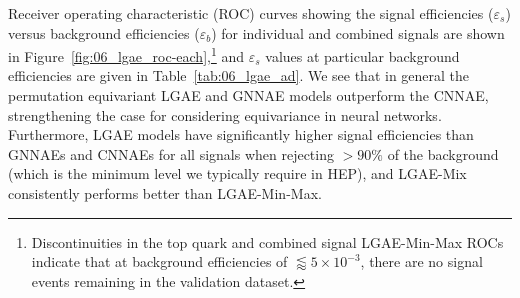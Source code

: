 Receiver operating characteristic (ROC) curves showing the signal efficiencies ($\varepsilon_s$) versus background efficiencies ($\varepsilon_b$) for individual and combined signals are shown in Figure~\ref{fig:06_lgae_roc-each},\footnote{Discontinuities in the top quark and combined signal LGAE-Min-Max ROCs indicate that at background efficiencies of $\lessapprox 5\times10^{-3}$, there are no signal events remaining in the validation dataset.} and $\varepsilon_s$ values at particular background efficiencies are given in Table~\ref{tab:06_lgae_ad}.
We see that in general the permutation equivariant LGAE and GNNAE models outperform the CNNAE, strengthening the case for considering equivariance in neural networks.
Furthermore, LGAE models have significantly higher signal efficiencies than GNNAEs and CNNAEs for all signals when rejecting $>90\%$ of the background (which is the minimum level we typically require in HEP), and LGAE-Mix consistently performs better than LGAE-Min-Max. 


